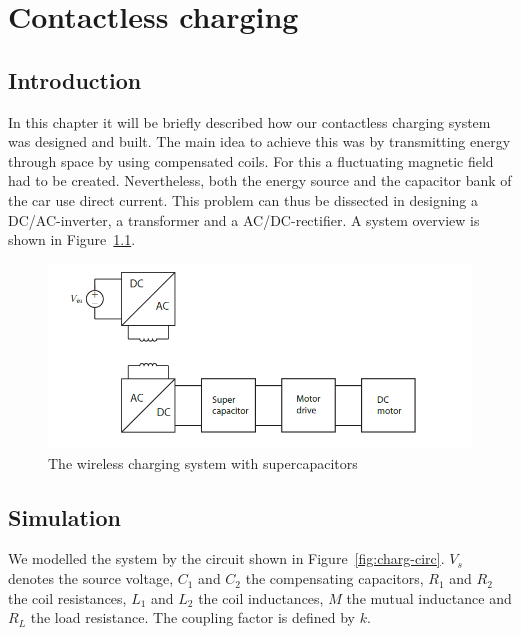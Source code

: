 \documentclass[11pt,titlepage]{report}
\begin{document}
\chapter{Contactless charging}
\label{ch:charging}
\section{Introduction}
In this chapter it will be briefly described how our contactless charging system was designed and built. The main idea to achieve this was by transmitting energy through space by using compensated coils. For this a fluctuating magnetic field had to be created. Nevertheless, both the energy source and the capacitor bank of the car use direct current. This problem can thus be dissected in designing a DC/AC-inverter, a transformer and a AC/DC-rectifier. A system overview is shown in Figure~\ref{fig:contactless-charging}.

\begin{figure}[H]
	\begin{center}
		\includegraphics[width=0.8\linewidth]{resource/contactless_charging.png}
	\end{center}
	\caption{The wireless charging system with supercapacitors}
	\label{fig:contactless-charging}
\end{figure}

\section{Simulation}
We modelled the system by the circuit shown in Figure~\ref{fig:charg-circ}. $V_s$ denotes the source voltage, $C_1$ and $C_2$ the compensating capacitors, $R_1$ and $R_2$ the coil resistances, $L_1$ and $L_2$ the coil inductances, $M$ the mutual inductance and $R_L$ the load resistance. The coupling factor is defined by $k$.
\end{document}
